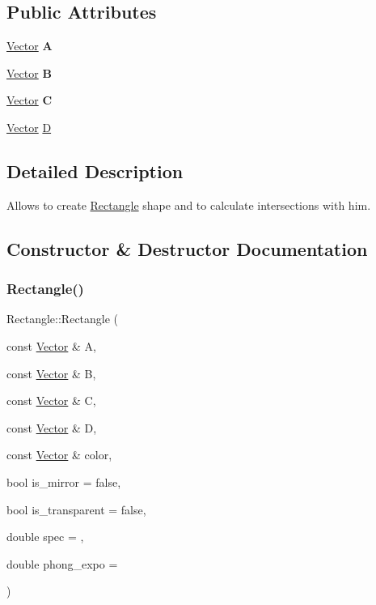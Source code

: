 \subsection*{Public Attributes}
\begin{DoxyCompactItemize}
\item 
\mbox{\label{classRectangle_a9d58cae8e0787b3fd7e515378ea41ad3}} 
\hyperlink{classVector}{Vector} {\bfseries A}
\item 
\mbox{\label{classRectangle_a46681f4a01c2521e52794a178f9b8c29}} 
\hyperlink{classVector}{Vector} {\bfseries B}
\item 
\mbox{\label{classRectangle_aaf4c5b4824a81e9c7b54633ffbedd5b8}} 
\hyperlink{classVector}{Vector} {\bfseries C}
\item 
\hyperlink{classVector}{Vector} \hyperlink{classRectangle_aef4ddf913d9986dd8f9c8ead043dacc1}{D}
\end{DoxyCompactItemize}


\subsection{Detailed Description}
Allows to create \hyperlink{classRectangle}{Rectangle} shape and to calculate intersections with him. 

\subsection{Constructor \& Destructor Documentation}
\mbox{\label{classRectangle_a8542be11e2dbec207af3f34f693b754c}} 
\subsubsection{\texorpdfstring{Rectangle()}{Rectangle()}}
{\footnotesize\ttfamily Rectangle\+::\+Rectangle (\begin{DoxyParamCaption}\item[{const \hyperlink{classVector}{Vector} \&}]{A,  }\item[{const \hyperlink{classVector}{Vector} \&}]{B,  }\item[{const \hyperlink{classVector}{Vector} \&}]{C,  }\item[{const \hyperlink{classVector}{Vector} \&}]{D,  }\item[{const \hyperlink{classVector}{Vector} \&}]{color,  }\item[{bool}]{is\+\_\+mirror = {\ttfamily false},  }\item[{bool}]{is\+\_\+transparent = {\ttfamily false},  }\item[{double}]{spec = {},  }\item[{double}]{phong\+\_\+expo = {} }\end{DoxyParamCaption})\hspace{0.3cm}{\ttfamily [inline]}}



